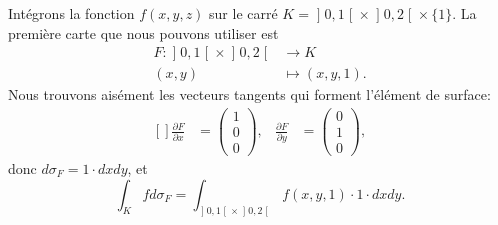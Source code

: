 Intégrons la fonction $f(x,y,z)$ sur le carré $K=\mathopen] 0 , 1 \mathclose[\times \mathopen] 0 , 2 \mathclose[\times\{ 1 \}$. La première carte que nous pouvons utiliser est
\begin{equation}
	\begin{aligned}
		F\colon \mathopen] 0 , 1 \mathclose[\times\mathopen] 0 , 2 \mathclose[&\to K \\
		(x,y)&\mapsto (x,y,1). 
	\end{aligned}
\end{equation}
Nous trouvons aisément les vecteurs tangents qui forment l'élément de surface:
\begin{equation}
	\begin{aligned}[]
		\frac{ \partial F }{ \partial x }&=\begin{pmatrix}
			1	\\ 
			0	\\ 
			0	
		\end{pmatrix},
		&\frac{ \partial F }{ \partial y }&=\begin{pmatrix}
			0	\\ 
			1	\\ 
			0	
		\end{pmatrix},
	\end{aligned}
\end{equation}
donc $d\sigma_F=1\cdot dxdy$, et
\begin{equation}		\label{IntKSurcarrUn}
	\int_Kfd\sigma_F=\int_{\mathopen] 0 , 1 \mathclose[\times\mathopen] 0 , 2 \mathclose[}f(x,y,1)\cdot 1\cdot dxdy.
\end{equation}

